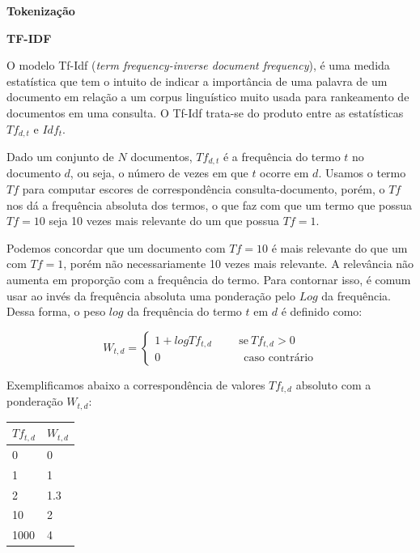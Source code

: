 \documentclass[a4paper,12pt]{article}
\begin{document}
\begin{description}
 \item \textbf{Tokenização}
 \item \textbf{TF-IDF}
 
O modelo Tf-Idf (\textit{term frequency-inverse document frequency}), é uma medida estatística que tem o intuito de indicar
a importância de uma palavra de um documento em relação a um corpus linguístico muito usada para rankeamento de documentos em uma consulta. O Tf-Idf trata-se do produto entre as estatísticas $Tf_{d,t}$ e
$Idf_{t}$.


Dado um conjunto de $N$ documentos, $Tf_{d,t}$ é a frequência do termo $t$ no documento
$d$, ou seja, o número de vezes em que $t$ ocorre em $d$. Usamos o termo $Tf$ para computar escores de correspondência consulta-documento,
porém, o $Tf$ nos dá a frequência absoluta dos termos, o que faz com que um termo que possua $Tf=10$ seja 10 vezes mais relevante do um que possua
$Tf=1$. 

Podemos concordar que um documento com $Tf=10$ é mais relevante do que um com $Tf=1$, porém não necessariamente 10 vezes mais relevante.
A relevância não aumenta em proporção com a frequência do termo. Para contornar isso, é comum usar ao invés da frequência absoluta uma ponderação
pelo $Log$ da frequência. Dessa forma, o peso $log$ da frequência do termo $t$ em $d$ é definido como:

\begin{equation}
  W_{t,d}=\begin{cases}
	    1 + logTf_{t,d}  \hspace{1cm} \text{se} \ Tf_{t,d} > 0 \\
	    0 \ \hspace{3cm} \text{caso contrário}
	  \end{cases}
\end{equation}


Exemplificamos abaixo a correspondência de valores $Tf_{t,d}$ absoluto com a ponderação $W_{t,d}$:

\begin{center}
\begin{tabular}{ll}
  \hline
  $Tf_{t,d}$ & $W_{t,d}$\\
  \hline
  0&0\\
  1&1\\
  2&1.3\\
  10&2\\
  1000&4\\
  
\end{tabular}
\end{center}



\end{description}
\end{document}
